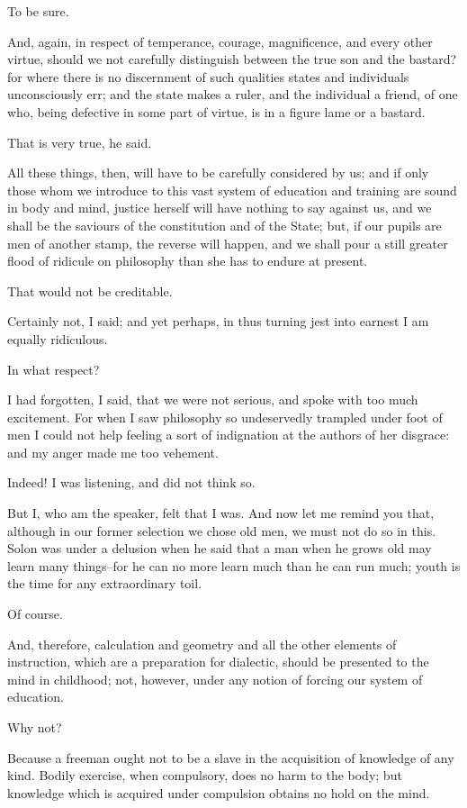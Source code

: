 To be sure.

And, again, in respect of temperance, courage, magnificence, and every
other virtue, should we not carefully distinguish between the true son
and the bastard? for where there is no discernment of such qualities
states and individuals unconsciously err; and the state makes a ruler,
and the individual a friend, of one who, being defective in some part of
virtue, is in a figure lame or a bastard.

That is very true, he said.

All these things, then, will have to be carefully considered by us; and
if only those whom we introduce to this vast system of education and
training are sound in body and mind, justice herself will have nothing
to say against us, and we shall be the saviours of the constitution and
of the State; but, if our pupils are men of another stamp, the reverse
will happen, and we shall pour a still greater flood of ridicule on
philosophy than she has to endure at present.

That would not be creditable.

Certainly not, I said; and yet perhaps, in thus turning jest into
earnest I am equally ridiculous.

In what respect?

I had forgotten, I said, that we were not serious, and spoke with too
much excitement. For when I saw philosophy so undeservedly trampled
under foot of men I could not help feeling a sort of indignation at the
authors of her disgrace: and my anger made me too vehement.

Indeed! I was listening, and did not think so.

But I, who am the speaker, felt that I was. And now let me remind you
that, although in our former selection we chose old men, we must not do
so in this. Solon was under a delusion when he said that a man when he
grows old may learn many things--for he can no more learn much than he
can run much; youth is the time for any extraordinary toil.

Of course.

And, therefore, calculation and geometry and all the other elements of
instruction, which are a preparation for dialectic, should be presented
to the mind in childhood; not, however, under any notion of forcing our
system of education.

Why not?

Because a freeman ought not to be a slave in the acquisition of
knowledge of any kind. Bodily exercise, when compulsory, does no harm
to the body; but knowledge which is acquired under compulsion obtains no
hold on the mind.

